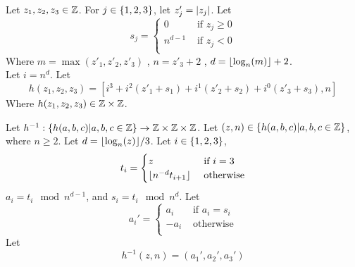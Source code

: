         Let $z_1, z_2, z_3 \in \mathbb{Z}$.
        For $j \in \{ 1,2,3 \}$, 
        let $z'_j = \left|z_j\right|$.
        Let \[
            s_j = 
            \begin{cases}
                0 & \text{ if $z_j \geq 0$} \\ 
                n^{d - 1} & \text{ if $z_j < 0$} \\ 
            \end{cases}
        \]
        Where $m = \max(z'_1, z'_2, z'_3)$
        , $n = z'_3 + 2$
        , $d = \lfloor \log_{n}(m) \rfloor + 2$.
        \\
        Let $i = n^d$.
        Let 
        \[
            h(z_1, z_2, z_3) =
                [
                    i^3 + i^2 (z'_1 + s_1) + i^1 (z'_2 + s_2) + i^0 (z'_3 + s_3)
                    , n
                ]
        \]
        Where $h(z_1, z_2, z_3) \in \mathbb{Z} \times \mathbb{Z}$.

        Let $h^{-1}: \{h(a,b,c) | a,b,c \in \mathbb{Z} \} \to \mathbb{Z} \times \mathbb{Z} \times \mathbb{Z}$.
        Let $(z, n) \in \{ h(a,b,c) | a,b,c \in \mathbb{Z} \}$, 
        where $n \geq 2$.
        Let $d = \lfloor \log_n(z) \rfloor / 3$.
        Let $i \in \{ 1,2,3 \}$,
        \[
            t_i = 
            \begin{cases}
                z & \text{ if $i = 3$} \\ 
                \lfloor n^{-d} t_{i+1} \rfloor & \text{ otherwise} \\ 
            \end{cases}
        \]
        $a_i = t_i \mod n^{d - 1}$,
        and $s_i = t_i \mod n^{d}$.
        Let
        \[
            a_i' = 
            \begin{cases}
                a_i & \text{ if $a_i = s_i$} \\ 
                -a_i & \text{ otherwise} \\ 
            \end{cases}
        \]
        Let 
        \[
            h^{-1}(z,n) = (a_1', a_2', a_3')
        \]

